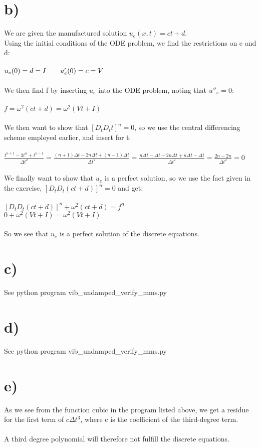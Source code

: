 \documentclass[a4paper,english,11pt,twoside]{article}
\newcommand{\tab}{\hspace*{2em}}
\begin{document}
\section*{b)}
We are given the manufactured solution $u_e(x,t) = ct + d.$\\
Using the initial conditions of the ODE problem, we find the restrictions on c and d:\\
\\
$u_e(0) = d = I\tab u'_e(0) = c = V$\\
\\
We then find f by inserting $u_e$ into the ODE problem, noting that $u''_e = 0$:\\
\\
$f = \omega^2(ct + d) = \omega^2(Vt + I)$\\
\\
We then want to show that $[D_tD_t t]^n = 0$, so we use the central differencing scheme employed earlier, and insert for t:\\
\\
$\frac{t^{n+1} - 2t^n + t^{n-1}}{\Delta t^2} = \frac{(n+1)\Delta t - 2n\Delta t + (n-1)\Delta t}{\Delta t^2} = \frac{n\Delta t - \Delta t - 2n\Delta t + n\Delta t - \Delta t}{\Delta t^2} = \frac{2n - 2n}{\Delta t^2} = 0$\\
\\
We finally want to show that $u_e$ is a perfect solution, so we use the fact given in the exercise, $[D_tD_t(ct+d)]^n = 0$ and get:\\
\\
$[D_tD_t(ct+d)]^n + \omega^2(ct + d) = f^n$\\
$0 + \omega^2(Vt + I) = \omega^2(Vt+I)$\\
\\
So we see that $u_e$ is a perfect solution of the discrete equations.

\section*{c)}
See python program vib\_undamped\_verify\_mms.py

\section*{d)}
 See python program vib\_undamped\_verify\_mms.py

\section*{e)}
As we see from the function cubic in the program listed above, we get a residue for the first term of $c\Delta t^3$, where c is the coefficient of the third-degree term.\\
\\
A third degree polynomial will therefore not fulfill the discrete equations.
\end{document}
